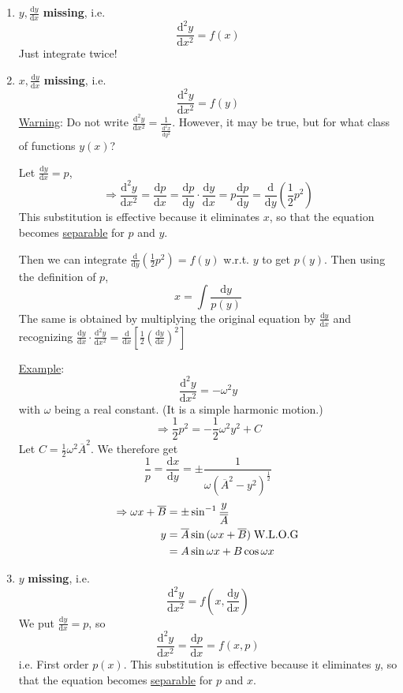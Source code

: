 \documentclass[12pt]{report}
\theoremstyle{definition}
\begin{document}
\begin{enumerate}[label = (\alph*)]
    \item $y, \frac{\mathrm{d}y}{\mathrm{d}x}$ \textbf{missing}, i.e. \[
            \frac{\mathrm{d}^{2}y}{\mathrm{d}x^{2}} = f(x)
    \]Just integrate twice!

\item $x, \frac{\mathrm{d}y}{\mathrm{d}x}$ \textbf{missing}, i.e. \[
        \frac{\mathrm{d}^{2}y}{\mathrm{d}x^{2}} = f(y)
\]
\underline{Warning}: Do not write $\frac{\mathrm{d}^{2}y}{\mathrm{d}x^{2}} = \frac{1}{\frac{\mathrm{d}^{2}x}{\mathrm{d}y^{2}} } $.
However, it may be true, but for what class of functions $y(x)$?

Let $\frac{\mathrm{d}y}{\mathrm{d}x} = p$,\[
    \Rightarrow \frac{\mathrm{d}^{2}y}{\mathrm{d}x^{2}} = \frac{\mathrm{d}p}{\mathrm{d}x} 
    =\frac{\mathrm{d}p}{\mathrm{d}y} \cdot \frac{\mathrm{d}y}{\mathrm{d}x} = p \frac{\mathrm{d}p}{\mathrm{d}y} 
    = \frac{\mathrm{d}}{\mathrm{d}y} \left(\frac{1}{2}p^{2}\right) 
\]This substitution is effective because it eliminates $x$,
so that the equation becomes \underline{separable} for $p$ and $y$.

Then we can integrate $\frac{\mathrm{d}}{\mathrm{d}y} \left(\frac{1}{2}p^{2}\right) = f(y)$
w.r.t. $y$ to get $p(y)$. Then using the definition of $p$,\[
x = \int \frac{\mathrm{d}y}{p(y)}
\]
The same is obtained by multiplying the original equation by $\frac{\mathrm{d}y}{\mathrm{d}x} $
and recognizing $\frac{\mathrm{d}y}{\mathrm{d}x} \cdot \frac{\mathrm{d}^{2}y}{\mathrm{d}x^{2}} 
= \frac{\mathrm{d}}{\mathrm{d}x} \left[\frac{1}{2}{(\frac{\mathrm{d}y}{\mathrm{d}x} )}^{2}\right] $

\underline{Example}: \[
    \frac{\mathrm{d}^{2}y}{\mathrm{d}x^{2}} = -\omega^{2}y
\]with $\omega$ being a real constant. (It is a simple harmonic motion.)
\[
    \Rightarrow \frac{1}{2}p^{2} = -\frac{1}{2}\omega^{2}y^{2} + C
\]Let $C = \frac{1}{2}\omega^{2}\overline{A}^{2}$. We therefore get\[
\frac{1}{p} = \frac{\mathrm{d}x}{\mathrm{d}y} = \pm \frac{1}{\omega {(\overline{A}^{2} - y^{2})}^{\frac{1}{2}}}
\]\[
\begin{align*}
    \Rightarrow \omega x + \overline{B} & = \pm \sin^{-1}{\frac{y}{\overline{A}}} \\
        y & = \overline{A} \sin{(\omega x + \overline{B})} \;\textnormal{W.L.O.G} \\
          & = A\sin{\omega x} + B\cos{\omega x}
\end{align*}
\]

\item $y$ \textbf{missing}, i.e. \[
        \frac{\mathrm{d}^{2}y}{\mathrm{d}x^{2}} = f\left(x, \frac{\mathrm{d}y}{\mathrm{d}x} \right) 
\]We put $\frac{\mathrm{d}y}{\mathrm{d}x} = p$, so\[
\frac{\mathrm{d}^{2}y}{\mathrm{d}x^{2}} = \frac{\mathrm{d}p}{\mathrm{d}x} = f\left(x, p\right) 
\]
i.e. First order $p(x)$. This substitution is effective because it eliminates $y$,
so that the equation becomes \underline{separable} for $p$ and $x$.


\end{enumerate}
\end{document}
